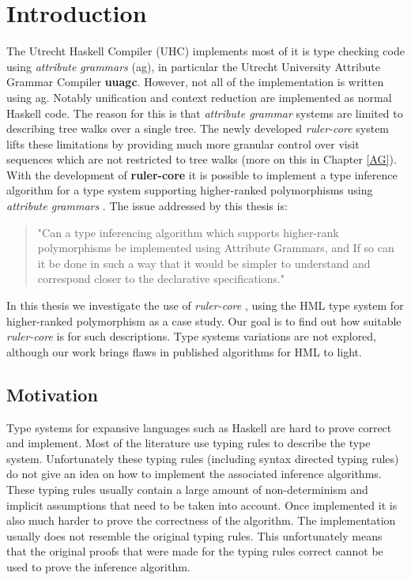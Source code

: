 \documentclass[twoside, titlepage, openright, a4paper]{book}
\newcommand{\ag}{\emph{attribute grammar }}
\newcommand{\ags}{\emph{attribute grammars }}
\newcommand{\rcore}{\emph{ruler-core }}
\begin{document}





\newpage
\thispagestyle{headings}
\mbox{}

\tableofcontents

\chapter{Introduction}
The Utrecht Haskell Compiler (UHC\cite{UHC}) implements most of it is type checking code using \ags (ag), in particular the Utrecht University Attribute Grammar Compiler \textbf{uuagc}\cite{uuagc}. However, not all of the implementation is written using ag. Notably unification and context reduction are implemented as normal Haskell code. The reason for this is that \ag systems are limited to describing tree walks over a single tree. The newly developed \rcore system lifts these limitations by providing much more granular control over visit sequences which are not restricted to tree walks (more on this in Chapter \ref{AG}). With the development of \textbf{ruler-core}\cite{ruler-front} it is possible to implement a type inference algorithm for a type system supporting higher-ranked polymorphisms using \ags. The issue addressed by this thesis is:

\begin{quotation}
"Can a type inferencing algorithm which supports higher-rank polymorphisms be implemented using Attribute Grammars, and If so can it be done in such a way that it would be simpler to understand and correspond closer to the declarative specifications."
\end{quotation}

In this thesis we investigate the use of \rcore, using the HML type system for higher-ranked polymorphism as a case study. Our goal is to find out how suitable \rcore is for such descriptions. Type systems variations are not explored, although our work brings flaws in published algorithms for HML to light.

\section{Motivation}
Type systems for expansive languages such as Haskell are hard to prove correct and implement. Most of the literature use typing rules to describe the type system. Unfortunately these typing rules (including syntax directed typing rules) do not give an idea on how to implement the associated inference algorithms. These typing rules usually contain a large amount of non-determinism and implicit assumptions that need to be taken into account.
Once implemented it is also much harder to prove the correctness of the algorithm. The implementation usually does not resemble the original typing rules. This unfortunately means that the original proofs that were made for the typing rules correct cannot be used to prove the inference algorithm.
\end{document}
